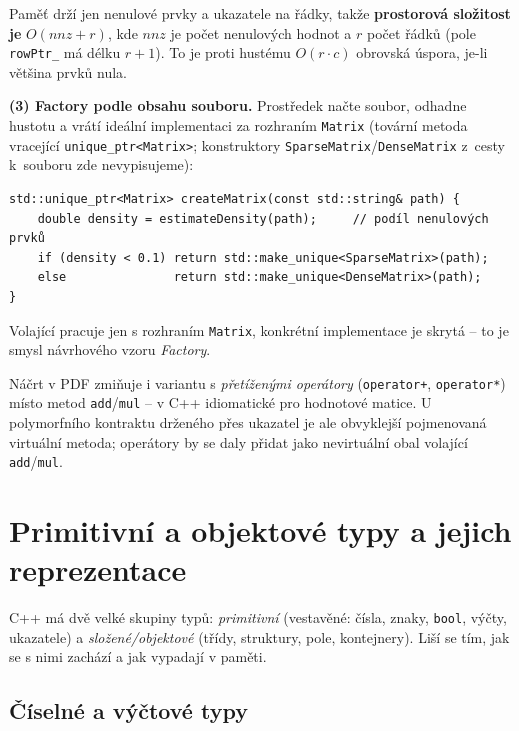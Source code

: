 \documentclass[11pt,a4paper]{article}
\newcommand{\cd}{\lstinline[style=cpp]}
\begin{document}
\begin{priklad}
Paměť drží jen nenulové prvky a ukazatele na řádky, takže \textbf{prostorová složitost je} $\boxed{O(\mathit{nnz} + r)}$, kde $\mathit{nnz}$ je počet nenulových hodnot a $r$ počet řádků (pole \texttt{rowPtr\_} má délku $r+1$). To je proti hustému $O(r\cdot c)$ obrovská úspora, je-li většina prvků nula.

\textbf{(3) Factory podle obsahu souboru.} Prostředek načte soubor, odhadne hustotu a vrátí ideální implementaci za rozhraním \texttt{Matrix} (tovární metoda vracející \cd{unique_ptr<Matrix>}; konstruktory \texttt{SparseMatrix}/\texttt{DenseMatrix} z~cesty k~souboru zde nevypisujeme):

\begin{lstlisting}[style=cpp]
std::unique_ptr<Matrix> createMatrix(const std::string& path) {
    double density = estimateDensity(path);     // podíl nenulových prvků
    if (density < 0.1) return std::make_unique<SparseMatrix>(path);
    else               return std::make_unique<DenseMatrix>(path);
}
\end{lstlisting}

Volající pracuje jen s rozhraním \texttt{Matrix}, konkrétní implementace je skrytá -- to je smysl návrhového vzoru \emph{Factory}.

\begin{poznamka}
Náčrt v PDF zmiňuje i variantu s \emph{přetíženými operátory} (\cd{operator+}, \cd{operator*}) místo metod \texttt{add}/\texttt{mul} -- v C++ idiomatické pro hodnotové matice. U polymorfního kontraktu drženého přes ukazatel je ale obvyklejší pojmenovaná virtuální metoda; operátory by se daly přidat jako nevirtuální obal volající \texttt{add}/\texttt{mul}.
\end{poznamka}
\end{priklad}

\section{Primitivní a objektové typy a jejich reprezentace}

C++ má dvě velké skupiny typů: \emph{primitivní} (vestavěné: čísla, znaky, \cd{bool}, výčty, ukazatele) a \emph{složené/objektové} (třídy, struktury, pole, kontejnery). Liší se tím, jak se s nimi zachází a jak vypadají v paměti.

\subsection{Číselné a výčtové typy}
\end{document}
